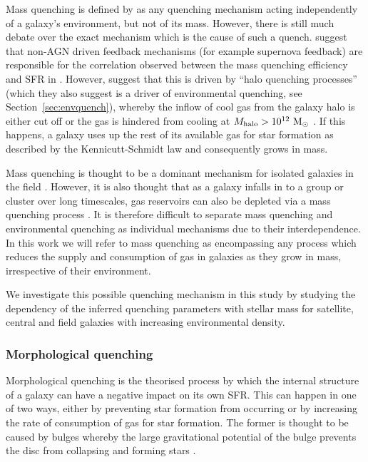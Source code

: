 \documentclass[useAMS,usenatbib]{mn2e}
\def\minor		{\color{minorcol}}
\begin{document}
Mass quenching is defined by \citet{peng10, peng12} as any quenching mechanism acting independently of a galaxy's environment, but not of its mass. However, there is still much debate over the exact mechanism which is the cause of such a quench. \citet{darvish16} suggest that non-AGN driven feedback mechanisms (for example supernova feedback) are responsible for the correlation observed between the mass quenching efficiency and SFR in \citet{peng10}. However, \citet{gabor15} suggest that this is driven by ``halo quenching processes'' {\minor (which they also suggest is a driver of environmental quenching, see Section~\ref{sec:envquench})}, whereby the inflow of cool gas from the galaxy halo is either cut off or the gas is hindered from cooling at $M_{\rm{halo}} > 10^{12}~\rm{M}_{\odot}$ \citep{birnboim03, dekel06}. If this happens, a galaxy uses up the rest of its available gas for star formation as described by the Kennicutt-Schmidt law \citep{schmidt59, kennicutt98} and consequently grows in mass.

Mass quenching is thought to be a dominant mechanism for isolated galaxies in the field \citep{kormendy04}. However, it is also thought that as a galaxy infalls in to a group or cluster over long timescales, gas reservoirs can also be depleted via a mass quenching process \citep{peng12}. {\minor It is therefore difficult to separate mass quenching and environmental quenching as individual mechanisms due to their interdependence. In this work we will refer to mass quenching as encompassing any process which reduces the supply and consumption of gas in galaxies as they grow in mass, irrespective of their environment.}

We investigate this possible quenching mechanism in this study by studying the dependency of the inferred quenching parameters with stellar mass for satellite, central and field galaxies {\minor with increasing environmental density.} 
 
\subsubsection{Morphological quenching}\label{sec:morphquench}

Morphological quenching is the theorised process by which the internal structure of a galaxy can have a negative impact on its own SFR. This can happen in one of two ways, either by preventing star formation from occurring or by increasing the rate of consumption of gas for star formation. The former is thought to be caused by bulges \citep{bluck14} whereby the large gravitational potential of the bulge prevents the disc from collapsing and forming stars \citep{Fang13}. 
\end{document}
